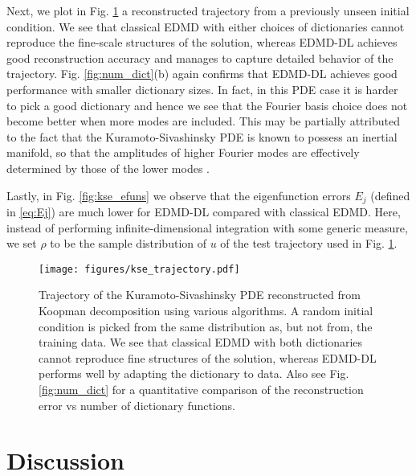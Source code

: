 \documentclass[%
 aip,
 cha,
 sd,%
 amsmath,amssymb,
 preprint,%
]{revtex4-1}
\begin{document}
Next, we plot in Fig. \ref{fig:kse_traj} a reconstructed trajectory from a previously unseen initial condition. We see that classical EDMD with either choices of dictionaries cannot reproduce the fine-scale structures of the solution, whereas EDMD-DL achieves good reconstruction accuracy and manages to capture detailed behavior of the trajectory. Fig. \ref{fig:num_dict}(b) again confirms that EDMD-DL achieves good performance with smaller dictionary sizes. In fact, in this PDE case it is harder to pick a good dictionary and hence we see that the Fourier basis choice does not become better when more modes are included. This may be partially attributed to the fact that the Kuramoto-Sivashinsky PDE is known to possess an inertial manifold, so that the amplitudes of higher Fourier modes are effectively determined by those of the lower modes \cite{constantin2012integral,jolly1990approximate}. 

Lastly, in Fig. \ref{fig:kse_efuns} we observe that the eigenfunction errors $E_j$ (defined in \eqref{eq:Ej}) are much lower for EDMD-DL compared with classical EDMD. Here, instead of performing infinite-dimensional integration with some generic measure, we set $\rho$ to be the sample distribution of $u$ of the test trajectory used in Fig. \ref{fig:kse_traj}.
\begin{figure}
	\begin{center}
		\texttt{[image: figures/kse\_trajectory.pdf]}
	\end{center}
	\caption{Trajectory of the Kuramoto-Sivashinsky PDE reconstructed from Koopman decomposition using various algorithms. A random initial condition is picked from the same distribution as, but not from, the training data. We see that classical EDMD with both dictionaries cannot reproduce fine structures of the solution, whereas EDMD-DL performs well by adapting the dictionary to data. Also see Fig. \ref{fig:num_dict} for a quantitative comparison of the reconstruction error vs number of dictionary functions. }
	\label{fig:kse_traj}
\end{figure}

\section{Discussion\label{sec:discussion}}
\end{document}
